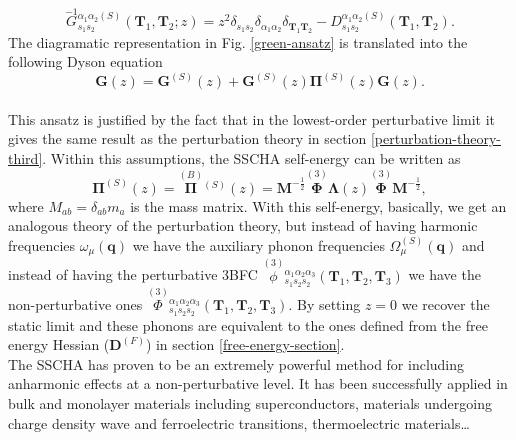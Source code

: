 \begin{equation}
 \overset{-1}{G}{}_{s_{1}s_{2}}^{\alpha_{1}\alpha_{2}(S)}(\mathbf{T}_{1},\mathbf{T}_{2};z)=z^{2}\delta_{s_{1}s_{2}}\delta_{\alpha_{1}\alpha_{2}}\delta_{\mathbf{T}_{1}\mathbf{T}_{2}}-D_{s_{1}s_{2}}^{\alpha_{1}\alpha_{2}(S)}(\mathbf{
 T}_{1},\mathbf{T}_{2}).
\end{equation}
The diagramatic representation in Fig. \ref{green-ansatz} is translated into the following Dyson equation
\begin{equation}
 \mathbf{G}(z)=\mathbf{G}^{(S)}(z)+\mathbf{G}^{(S)}(z)\boldsymbol{\Pi}^{(S)}(z)\mathbf{G}(z).
\end{equation}
\\

This ansatz is justified by the fact that in the lowest-order perturbative limit it gives the same result 
as the perturbation theory in section \ref{perturbation-theory-third}. Within this assumptions, the SSCHA self-energy can be written as\cite{bianco2017second}
\begin{equation}
 \boldsymbol{\Pi}^{(S)}(z)=\overset{(B)}{\boldsymbol{\Pi}}{}^{(S)}(z)=\boldsymbol{M}^{-\frac{1}{2}}\overset{(3)}{\boldsymbol{\Phi}}\boldsymbol{\Lambda}(z)\overset{(3)}{\boldsymbol{\Phi}}\boldsymbol{M}^{-\frac{1}{2}},
\end{equation} 
where $M_{ab}=\delta_{ab}m_{a}$ is the mass matrix. With this self-energy, basically, we get an analogous theory of the perturbation theory, but instead of having harmonic frequencies $\omega_{\mu}(\mathbf{q})$ we 
have the auxiliary phonon frequencies $\Omega^{(S)}_{\mu}(\mathbf{q})$ and instead of having the perturbative 3BFC $\overset{(3)}{\phi}{}_{s_{1}s_{2}s_{2}}^{\alpha_{1}\alpha_{2}\alpha_{3}}(\mathbf{T}_{1},\mathbf{
 T}_{2},\mathbf{T}_{3})$ we have the non-perturbative ones $\overset{(3)}{\Phi}{}_{s_{1}s_{2}s_{2}}^{\alpha_{1}\alpha_{2}\alpha_{3}}(\mathbf{T}_{1},\mathbf{T}_{2},\mathbf{T}_{3})$. By setting $z=0$ we recover the static limit and these 
 phonons are equivalent to the ones defined from the free energy Hessian ($\boldsymbol{D}^{(F)}$) in 
 section \ref{free-energy-section}. \\

The SSCHA has proven to be an extremely powerful method for including anharmonic effects at a non-perturbative level. It has been successfully applied in bulk and monolayer materials including 
superconductors\cite{errea2013first,errea2016quantum}, materials undergoing charge density wave\cite{leroux2015strong,bianco2019quantum} and ferroelectric\cite{ribeiro2018strong} transitions, thermoelectric 
materials\cite{aseginolaza2019phonon}\dots
